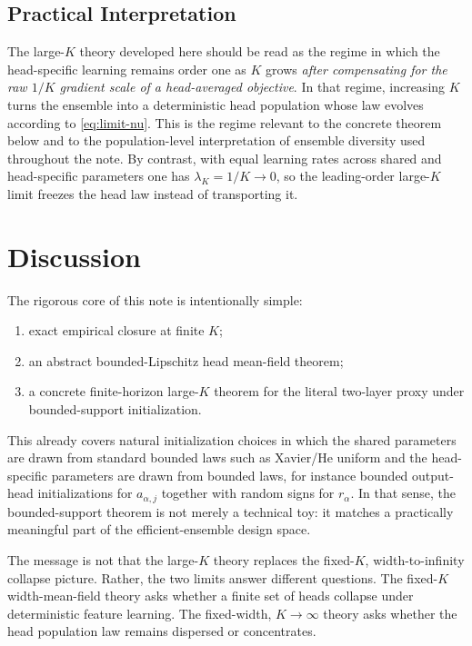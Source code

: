 \documentclass{article}
\theoremstyle{definition}
\begin{document}
\subsection{Practical Interpretation}

The large-$K$ theory developed here should be read as the regime in which the
head-specific learning remains order one as $K$ grows \emph{after compensating
for the raw $1/K$ gradient scale of a head-averaged objective}. In that regime,
increasing $K$ turns the ensemble into a deterministic head population whose
law evolves according to \eqref{eq:limit-nu}. This is the regime relevant to
the concrete theorem below and to the population-level interpretation of
ensemble diversity used throughout the note. By contrast, with equal learning
rates across shared and head-specific parameters one has $\lambda_K=1/K\to 0$,
so the leading-order large-$K$ limit freezes the head law instead of transporting
it.

\section{Discussion}
\label{sec:discussion}

The rigorous core of this note is intentionally simple:
\begin{enumerate}[leftmargin=2em]
  \item exact empirical closure at finite $K$;
  \item an abstract bounded-Lipschitz head mean-field theorem;
  \item a concrete finite-horizon large-$K$ theorem for the literal two-layer proxy under bounded-support initialization.
\end{enumerate}

This already covers natural initialization choices in which the shared
parameters are drawn from standard bounded laws such as Xavier/He uniform and
the head-specific parameters are drawn from bounded laws, for instance bounded
output-head initializations for $a_{\alpha,j}$ together with random signs for
$r_\alpha$. In that sense, the bounded-support theorem is not merely a technical toy:
it matches a practically meaningful part of the efficient-ensemble design space.

The message is not that the large-$K$ theory replaces the fixed-$K$,
width-to-infinity collapse picture. Rather, the two limits answer different
questions. The fixed-$K$ width-mean-field theory asks whether a finite set of
heads collapse under deterministic feature learning. The fixed-width,
$K\to\infty$ theory asks whether the head population law remains dispersed or
concentrates.
\end{document}
